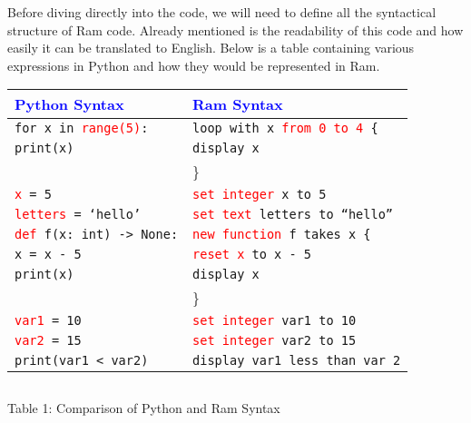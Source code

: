 \documentclass[fontsize=11pt]{article}
\newcommand{\blue}[1]{\textcolor{blue}{#1}}
\newcommand{\red}[1]{\textcolor{red}{#1}}
\begin{document}
Before diving directly into the code, we will need to define all the syntactical structure of Ram code. Already mentioned is the readability of this code and how easily it can be translated to English. Below is a table containing various expressions in Python and how they would be represented in Ram.

\begin{center}
    \begin{spacing}{1.1}
    
        \begin{tabular}{|l|l|} 
             \hline
             
             \blue{Python Syntax} & \blue{Ram Syntax} \\ 
             
             \hline
             \texttt{for x in \red{range(5)}:} & \texttt{loop with x \red{from 0 to 4} \{ } \\ 
             \quad \quad \texttt{print(x)} & \quad \quad  \texttt{display x} \\
              & \} \\
             
             \hline
             
             \texttt{\red{x} = 5} & \texttt{\red{set integer} x to 5} \\
             
             \hline
             
             \texttt{\red{letters} = `hello'} & \texttt{\red{set text} letters to ``hello''} \\
             
             \hline
             
             \texttt{\red{def} f(x: int) -> None:} & \texttt{\red{new function} f takes x \{ } \\
             \quad \quad \texttt{x = x - 5} & \quad \quad \texttt{\red{reset x} to x - 5} \\
             \quad \quad \texttt{print(x)} & \quad \quad \texttt{display x} \\
              & \} \\
             
             \hline
             
             \texttt{\red{var1} = 10} & \texttt{\red{set integer} var1 to 10} \\ 
             \texttt{\red{var2} = 15 } &               \texttt{\red{set integer} var2 to 15} \\
             \texttt{print(var1 < var2)} & \texttt{display var1 less than var 2} \\

              
             \hline
        \end{tabular}
    
    \end{spacing}
    
    $ $
    
    \small{Table 1: Comparison of Python and Ram Syntax}
    
\end{center}
\end{document}
